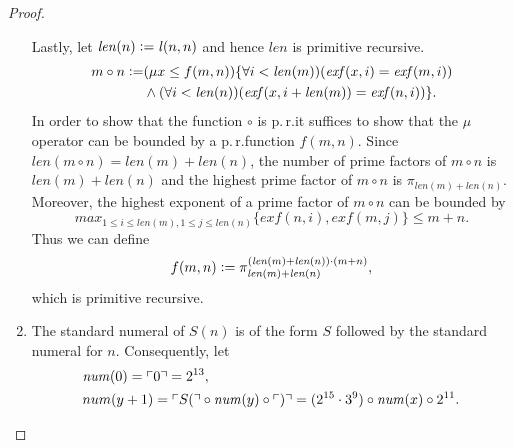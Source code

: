 \begin{proof}
\begin{enumerate}
Lastly, let $\mathit{len}(n) \vcentcolon= \mathit{l}(n,n)$ and hence $\mathit{len}$ is primitive recursive.
\begin{align*}
     m \circ n  \vcentcolon= & (\mu x \le f(m,n) )  \lbrace \forall i < \mathit{len}(m))  (\mathit{exf}(x,i) = \mathit{exf}(m,i) ) \\ 
    & \wedge  ( \forall i < \mathit{len}(n))  ( \mathit{exf}(x, i + \mathit{len}(m)) = \mathit{exf}(n,i) ) \rbrace. 
\end{align*}
In order to show that the function $\circ$ is p.\,r.\@ it suffices to show that the $\mu$ operator can be bounded by a p.\,r.\@ function $f(m,n)$. Since $\mathit{len}(m \circ n) = \mathit{len}(m) + \mathit{len}(n)$, the number of prime factors of $m \circ n$ is $\mathit{len}(m) + \mathit{len}(n)$ and the highest prime factor of $m \circ n$ is $\pi_{\mathit{len}(m)+\mathit{len}(n)}$. Moreover, the highest exponent of a prime factor of $m \circ n$ can be bounded by \[max_{1 \le i \le \mathit{len}(m), 1 \le j \le \mathit{len}(n)} \lbrace \mathit{exf}(n,i), \mathit{exf}(m,j) \rbrace \le m+n. \] Thus we can define \[f(m,n) \vcentcolon= \pi_{\mathit{len}(m)+\mathit{len}(n)}^{(\mathit{len}(m)+\mathit{len}(n))\cdot (m+n)},\]
which is primitive recursive.
\item The standard numeral of $S(n)$ is of the form $S$ followed by the standard numeral for $n$. Consequently, let 
\begin{align*}
    &\mathit{num}(0)= \ulcorner 0 \urcorner =  2^{13}, \\ 
    &num(y+1) = \ulcorner S (\urcorner \circ \mathit{num}(y) \circ \ulcorner )\urcorner= (2^{15} \cdot 3^{9}) \circ \mathit{num}(x) \circ 2^{11}.
\end{align*}
\end{enumerate} 
\end{proof}

